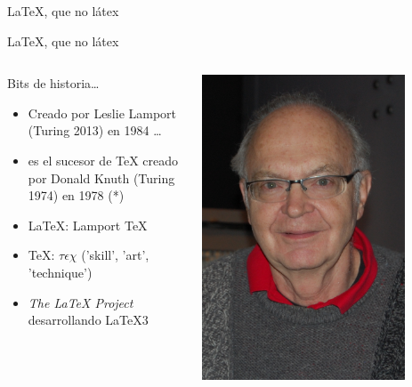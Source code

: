 \begin{frame}{\LaTeX, que no látex}
\end{frame}

\begin{frame}{\LaTeX, que no látex}
    \begin{columns}

        \begin{block}{Bits de historia\ldots{}}
            \begin{itemize}
                \item Creado por Leslie Lamport (Turing 2013) en 1984 \ldots{}
                \item es el sucesor de TeX creado por Donald Knuth (Turing 1974) en 1978 (*)
                \item \LaTeX{}: Lamport TeX
                \item TeX: $\tau\epsilon\chi$ ('skill', 'art', 'technique')
                \item \textit{The \LaTeX{} Project} desarrollando \LaTeX{}3 
            \end{itemize}
        \end{block}

            \hspace{0.5cm}\includegraphics[width=0.8\textwidth]{images/knuth.jpg}
    \end{columns}
\end{frame}